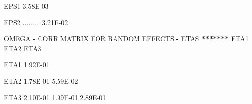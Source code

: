 \documentclass[
  11pt,
  krantz2, a4paper, twoside]{krantz}
\newenvironment{Shaded}{\begin{snugshade}}{\end{snugshade}}
\newcommand{\ErrorTok}[1]{\textcolor[rgb]{0.64,0.00,0.00}{\textbf{#1}}}
\newcommand{\FloatTok}[1]{\textcolor[rgb]{0.00,0.00,0.81}{#1}}
\newcommand{\NormalTok}[1]{#1}
\newcommand{\OperatorTok}[1]{\textcolor[rgb]{0.81,0.36,0.00}{\textbf{#1}}}
\newcommand{\StringTok}[1]{\textcolor[rgb]{0.31,0.60,0.02}{#1}}
\theoremstyle{definition}
\theoremstyle{definition}
\theoremstyle{definition}
\theoremstyle{remark}
\begin{document}
\begin{Shaded}
\begin{Highlighting}[]
\NormalTok{EPS1    }\FloatTok{3.58E{-}03}                                                                                       
                                                                                                       
\NormalTok{EPS2   .........  }\FloatTok{3.21E{-}02}                                                                             
                                                                                                       
                                                                                                       
                                                                                                       
                                                                                                       
\NormalTok{OMEGA }\OperatorTok{{-}}\StringTok{ }\NormalTok{CORR MATRIX FOR RANDOM EFFECTS }\OperatorTok{{-}}\StringTok{ }\NormalTok{ETAS  }\OperatorTok{**}\ErrorTok{*****}\StringTok{                                                 }
\StringTok{                                                                                                       }
\StringTok{                                                                                                       }
\StringTok{        }\NormalTok{ETA1      ETA2      ETA3                                                                       }
                                                                                                       
\NormalTok{ETA1    }\FloatTok{1.92E{-}01}                                                                                       
                                                                                                       
\NormalTok{ETA2    }\FloatTok{1.78E{-}01}  \FloatTok{5.59E{-}02}                                                                             
                                                                                                       
\NormalTok{ETA3    }\FloatTok{2.10E{-}01}  \FloatTok{1.99E{-}01}  \FloatTok{2.89E{-}01}                                                                   
                                                                                                       
                                                                                                       
                                                                                                       

\end{Highlighting}
\end{Shaded}
\end{document}
